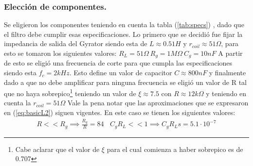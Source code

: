 \subsubsection{Elección de componentes.}
Se eligieron los componentes teniendo en cuenta la tabla (\ref{tab:specs}) , dado que el filtro debe cumplir esas especificaciones.
Lo primero que se decidió fue fijar la impedancia de salida del Gyrator siendo esta de $L \approx 0.51H $ y $r_{coil} \approx 51\Omega $, para esto se tomaron los siguientes valores: $R_L = 51\Omega \ R_g = 1M\Omega \ C_g = 10nF$
A partir de esto se eligió una frecuencia de corte para que cumpla las especificaciones siendo esta  $f_c =2kHz $. Esto define un valor de capacitor $C \approx 800nF$ y finalmente dado a que no debe amplificar para ninguna frecuencia se eligió un valor de R tal que no haya sobrepico\footnote{Cabe aclarar que el valor de $\xi$ para el cual comienza a haber sobrepico es de 0.707} teniendo un valor de $\xi \approx 7.5 $ con $R \approx 12k\Omega $ y teniendo en cuenta la $r_{coil} = 51\Omega$  
Vale la pena notar que las aproximaciones que se expresaron en (\ref{eq:basicL2}) siguen vigentes. En este caso se tienen los siguientes valores:
\begin{align}  R<<R_g \implies  \frac{R_g}{R}=  84 \ \ \ \ C_gR_L << 1 \implies C_gR_Ls =5.1\cdot 10^{-7}\end{align}



